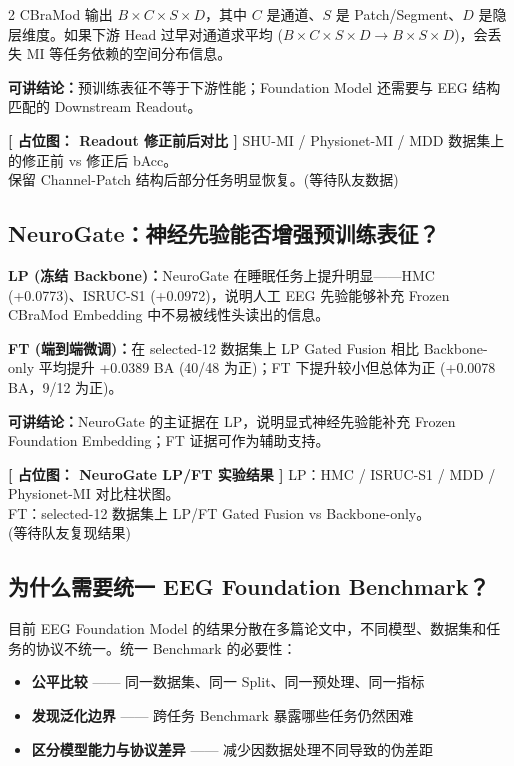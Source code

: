 \documentclass[12pt, a0paper]{article}
\renewcommand{\Large}{\fontsize{34}{42}\selectfont}
\renewcommand{\small}{\fontsize{18}{24}\selectfont}
\newcommand{\placeholder}[2]{%
    \begin{center}
    \colorbox{mygray!12}{\parbox{0.9\columnwidth}{%
        \centering
        \vspace{1.5em}
        {\Large\bfseries\color{mygray} [ 占位图： #1 ]}
        \vspace{0.8em}
        {\small\color{mygray} #2}
        \vspace{1.5em}
    }}
    \end{center}
}
\begin{document}
\begin{multicols}{2}
CBraMod 输出 $B \times C \times S \times D$，其中 $C$ 是通道、$S$ 是 Patch/Segment、$D$ 是隐层维度。如果下游 Head 过早对通道求平均 ($B \times C \times S \times D \rightarrow B \times S \times D$)，会丢失 MI 等任务依赖的空间分布信息。

\textbf{可讲结论：}预训练表征不等于下游性能；Foundation Model 还需要与 EEG 结构匹配的 Downstream Readout。

\placeholder{Readout 修正前后对比}{%
    SHU-MI / Physionet-MI / MDD 数据集上的修正前 vs 修正后 bAcc。\\
    保留 Channel-Patch 结构后部分任务明显恢复。\quad (等待队友数据)}

\subsection{NeuroGate：神经先验能否增强预训练表征？}

\textbf{LP (冻结 Backbone)：}NeuroGate 在睡眠任务上提升明显——HMC (+0.0773)、ISRUC-S1 (+0.0972)，说明人工 EEG 先验能够补充 Frozen CBraMod Embedding 中不易被线性头读出的信息。

\textbf{FT (端到端微调)：}在 selected-12 数据集上 LP Gated Fusion 相比 Backbone-only 平均提升 +0.0389 BA (40/48 为正)；FT 下提升较小但总体为正 (+0.0078 BA，9/12 为正)。

\textbf{可讲结论：}NeuroGate 的主证据在 LP，说明显式神经先验能补充 Frozen Foundation Embedding；FT 证据可作为辅助支持。

\placeholder{NeuroGate LP/FT 实验结果}{%
    LP：HMC / ISRUC-S1 / MDD / Physionet-MI 对比柱状图。\\
    FT：selected-12 数据集上 LP/FT Gated Fusion vs Backbone-only。\\
    \small (等待队友复现结果)}

\subsection{为什么需要统一 EEG Foundation Benchmark？}

目前 EEG Foundation Model 的结果分散在多篇论文中，不同模型、数据集和任务的协议不统一。统一 Benchmark 的必要性：

\begin{itemize}
    \item \textbf{公平比较} —— 同一数据集、同一 Split、同一预处理、同一指标
    \item \textbf{发现泛化边界} —— 跨任务 Benchmark 暴露哪些任务仍然困难
    \item \textbf{区分模型能力与协议差异} —— 减少因数据处理不同导致的伪差距
\end{itemize}


\end{multicols}
\end{document}
